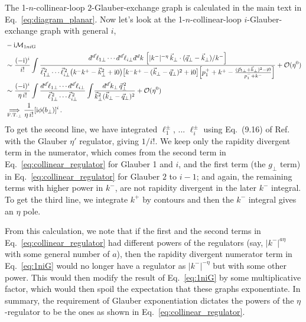 \documentclass[letterpaper,11pt]{article}
\newcommand{\eq}[1]{Eq.~\eqref{eq:#1}}
\newcommand{\abs}[1]{\lvert#1\rvert}
\newcommand{\img}{\mathrm{i}}
\newcommand{\cM}{\mathcal{M}}
\newcommand{\cO}{\mathcal{O}}
\newcommand{\nn}{\nonumber}
\newcommand{\dbar}{d\hspace*{-0.08em}\bar{}\hspace*{0.1em}}
\begin{document}
The 1-$n$-collinear-loop $2$-Glauber-exchange graph is calculated in the main text in \eq{diagram_planar}. 
Now let's look at the 1-$n$-collinear-loop $i$-Glauber-exchange graph with general $i$,
\begin{align}\label{eq:1niG}
  &-\img\cM_{1ni\text{G}}\nn\\
 &\sim \frac{(-\img)^i}{i!} \int \frac{\dbar^{d'}\! \ell_{1\perp}\cdots \dbar^{d'}\! \ell_{i\perp}
 \dbar^d k \, 
 \left[\abs{k^-}^{-\eta} \, \vec k_\perp\cdot (\vec q_\perp-\vec k_\perp)/k^-\right]
 }{\vec\ell_{1\perp}^{\,2}\cdots \vec\ell_{i\perp}^{\,2}
 \bigl(k^- k^+ -\vec k_\perp^2 +\img0\bigr)
 \bigl[k^-k^+ -(\vec k_\perp-\vec q_\perp)^2 + \img0\bigr]
 \Bigl[p_1^++k^+ - \frac{(\vec p_{1\perp}+\vec k_\perp)^2 - \img0}{p_1^-+k^-}\Bigr] } +\cO(\eta^0) \nn \\
 &\sim \frac{(-\img)^i}{\eta\, i!} \int \frac{\dbar^{d'}\! \ell_{1\perp}\cdots \dbar^{d'}\! \ell_{i\perp}
 }{\vec\ell_{1\perp}^{\,2}\cdots \vec\ell_{i\perp}^{\,2}}
 \int\! \frac{\dbar^{d'}\!k_\perp\, \vec q_\perp^{\,2}
}{\vec k_\perp^2 (\vec k_\perp-\vec q_\perp)^2}+\cO(\eta^0)
\nn\\
& \underset{{\rm F.T.}_\perp}{\implies} \frac{1}{\eta\, i!}[\img\phi(b_\perp)]^i\,.
\end{align}
To get the second line, we have integrated $\ell_1^\pm$, ... $\ell_i^\pm$ using Eq.~(9.16) of Ref.~\cite{Rothstein:2016bsq} with the Glauber $\eta'$ regulator, giving $1/i!$.
We keep only the rapidity divergent term in the numerator, which comes from the second term in \eq{collinear_regulator} for Glauber 1 and $i$, and the first term (the $g_\perp$ term) in \eq{collinear_regulator} for Glauber $2$ to $i-1$; and again, the remaining terms with higher power in $k^-$, are not rapidity divergent in the later $k^-$ integral.
To get the third line, we integrate $k^+$ by contours and then the $k^-$ integral gives an $\eta$ pole.

From this calculation, we note that if the first and the second terms in \eq{collinear_regulator} had different powers of the regulators (say, $\abs{k^-}^{a\eta}$ with some general number of $a$), then the rapidity divergent numerator term in \eq{1niG} would no longer have a regulator as $\abs{k^-}^{-\eta}$ but with some other power. This would then modify the result of \eq{1niG} by some multiplicative factor, which would then spoil the expectation that these graphs exponentiate. In summary, the requirement of Glauber exponentiation dictates the powers of the $\eta$-regulator to be the ones as shown in \eq{collinear_regulator}.
\end{document}
